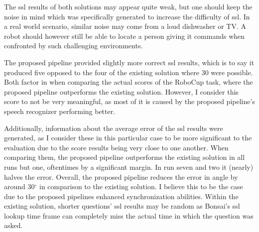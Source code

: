 The \gls{ssl} results of both solutions may appear quite weak, but one should keep the noise in mind which was specifically generated to increase the difficulty of \gls{ssl}.
In a real world scenario, similar noise may come from a loud dishwasher or TV.
A robot should however still be able to locate a person giving it commands when confronted by such challenging environments.

The proposed pipeline provided slightly more correct \gls{ssl} results, which is to say it produced five opposed to the four of the existing solution where 30 were possible.
Both factor in when comparing the actual scores of the RoboCup task, where the proposed pipeline outperforms the existing solution.
However, I consider this score to not be very meaningful, as most of it is caused by the proposed pipeline's speech recognizer performing better.

Additionally, information about the average error of the \gls{ssl} results were generated, as I consider these in this particular case to be more significant to the evaluation due to the score results being very close to one another.
When comparing them, the proposed pipeline outperforms the existing solution in all runs but one, oftentimes by a significant margin.
In run seven and two it (nearly) halves the error.
Overall, the proposed pipeline reduces the error in angle by around 30$^\circ$ in comparison to the existing solution.
I believe this to be the case due to the proposed pipelines enhanced synchronization abilities.
Within the existing solution, shorter questions' \gls{ssl} results may be random as Bonsai's \gls{ssl} lookup time frame can completely miss the actual time in which the question was asked.















